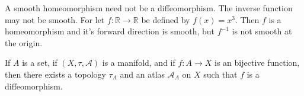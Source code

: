 \documentclass[oneside]{book}                                                  %
\begin{document}
                A smooth homeomorphism need not be a diffeomorphism. The inverse
                function may not be smooth. For let
                $f:\mathbb{R}\rightarrow\mathbb{R}$ be defined by $f(x)=x^{3}$.
                Then $f$ is a homeomorphism and it's forward direction is smooth,
                but $f^{\minus{1}}$ is not smooth at the origin.
                \begin{theorem}
                    If $A$ is a set, if $(X,\tau,\mathcal{A})$ is a manifold, and
                    if $f:A\rightarrow{X}$ is an bijective function, then there
                    exists a topology $\tau_{A}$ and an atlas $\mathcal{A}_{A}$
                    on $X$ such that $f$ is a diffeomorphism.
                \end{theorem}
\end{document}
